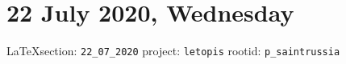  
 

\clearpage
\section{22 July 2020, Wednesday}

\vspace{0.5cm}
{\small\LaTeX section: \verb|22_07_2020| project: \verb|letopis| rootid: \verb|p_saintrussia|}
\vspace{0.5cm}

  

